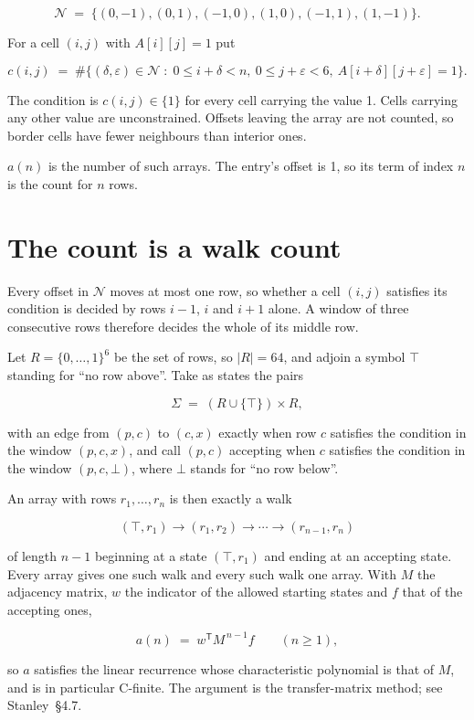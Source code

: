 \documentclass[11pt]{article}
\theoremstyle{definition}
\begin{document}
\[\mathcal{N} \;=\; \{(0,-1), (0,1), (-1,0), (1,0), (-1,1), (1,-1)\}.\]

For a cell $(i,j)$ with $A[i][j] = 1$ put

\[c(i,j) \;=\; \#\bigl\{(\delta,\varepsilon)\in\mathcal{N} \;:\; 0\le i+\delta<n,\ 0\le j+\varepsilon<6,\ A[i+\delta][j+\varepsilon] = 1\bigr\}.\]

The condition is $c(i,j) \in \{1\}$ for every cell carrying the value 1. Cells carrying any other value are unconstrained. Offsets leaving the array are not counted, so border cells have fewer neighbours than interior ones.

$a(n)$ is the number of such arrays. The entry's offset is 1, so its term of index $n$ is the count for $n$ rows.

\section{The count is a walk count}

Every offset in $\mathcal{N}$ moves at most one row, so whether a cell $(i,j)$ satisfies its condition is decided by rows $i-1$, $i$ and $i+1$ alone. A window of three consecutive rows therefore decides the whole of its middle row.

Let $R = \{0,\dots,1\}^{6}$ be the set of rows, so $|R| = 64$, and adjoin a symbol $\top$ standing for ``no row above''. Take as states the pairs

\[\Sigma \;=\; (R \cup \{\top\}) \times R,\]

with an edge from $(p,c)$ to $(c,x)$ exactly when row $c$ satisfies the condition in the window $(p,c,x)$, and call $(p,c)$ accepting when $c$ satisfies the condition in the window $(p,c,\bot)$, where $\bot$ stands for ``no row below''.

An array with rows $r_1,\dots,r_n$ is then exactly a walk

\[(\top,r_1) \to (r_1,r_2) \to \cdots \to (r_{n-1},r_n)\]

of length $n-1$ beginning at a state $(\top,r_1)$ and ending at an accepting state. Every array gives one such walk and every such walk one array. With $M$ the adjacency matrix, $w$ the indicator of the allowed starting states and $f$ that of the accepting ones,

\[a(n) \;=\; w^{\mathsf T} M^{\,n-1} f \qquad (n \ge 1),\]

so $a$ satisfies the linear recurrence whose characteristic polynomial is that of $M$, and is in particular C-finite. The argument is the transfer-matrix method; see Stanley~\S4.7.
\end{document}
